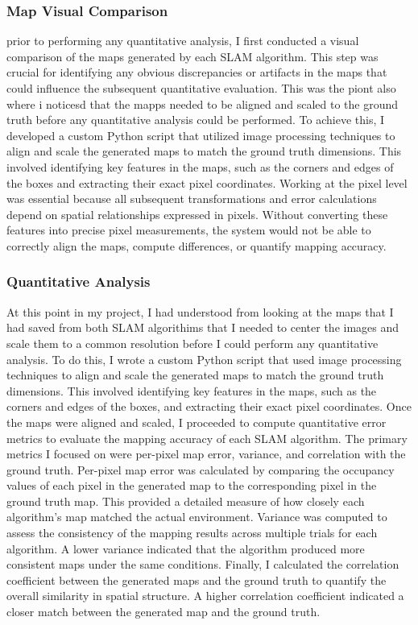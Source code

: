 \documentclass[runningheads,11pt]{llncs_bigfont_absbib}
\begin{document}
\subsubsection{Map Visual Comparison}
prior to performing any quantitative analysis, I first conducted a visual comparison of the maps generated by each SLAM algorithm. This step was crucial for identifying any obvious discrepancies or artifacts in the maps that could influence the subsequent quantitative evaluation.
This was the piont also where i noticesd that the mapps needed to be aligned and scaled to the ground truth before any quantitative analysis could be performed. To achieve this, 
I developed a custom Python script that utilized image processing techniques to align and scale the generated maps to match the ground truth dimensions. This involved identifying key features in the maps, such as the corners and edges of the boxes and extracting their exact pixel coordinates. 
Working at the pixel level was essential because all subsequent transformations and error calculations depend on spatial relationships expressed in pixels. Without converting these features into precise pixel measurements, the system would not be able to correctly align the maps, compute differences, or quantify mapping accuracy.

\subsubsection{Quantitative Analysis}
At this point in my project, I had understood from looking at the maps that I had saved from both SLAM algorithims that I needed to center the images and scale them to a common resolution before I could perform any quantitative analysis.
To do this, I wrote a custom Python script that used image processing techniques to align and scale the generated maps to match the ground truth dimensions. This involved identifying key features in the maps, such as the corners and edges of the boxes, and extracting their exact pixel coordinates. 
Once the maps were aligned and scaled, I proceeded to compute quantitative error metrics to evaluate the mapping accuracy of each SLAM algorithm. The primary metrics I focused on were per-pixel map error, variance, and correlation with the ground truth. 
Per-pixel map error was calculated by comparing the occupancy values of each pixel in the generated map to the corresponding pixel in the ground truth map. This provided a detailed measure of how closely each algorithm's map matched the actual environment. Variance was computed to assess the consistency of the mapping results across multiple trials for each algorithm. 
A lower variance indicated that the algorithm produced more consistent maps under the same conditions. Finally, I calculated the correlation coefficient between the generated maps and the ground truth to quantify the overall similarity in spatial structure. A higher correlation coefficient indicated a closer match between the generated map and the ground truth. 
\end{document}
